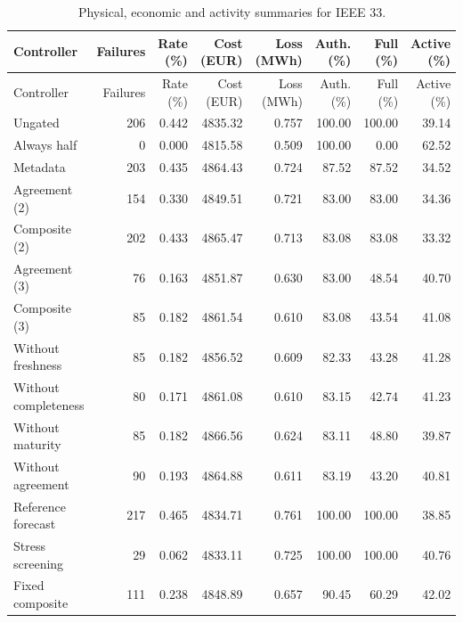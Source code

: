 \documentclass[11pt]{article}
\begin{document}
\small\begin{longtable}{lrrrrrrr}
\caption{Physical, economic and activity summaries for IEEE 33.}\\\toprule
Controller & Failures & Rate (\%) & Cost (EUR) & Loss (MWh) & Auth. (\%) & Full (\%) & Active (\%)\\\midrule
\endfirsthead
\toprule
Controller & Failures & Rate (\%) & Cost (EUR) & Loss (MWh) & Auth. (\%) & Full (\%) & Active (\%)\\\midrule
\endhead
\bottomrule\endfoot
Ungated & 206 & 0.442 & 4835.32 & 0.757 & 100.00 & 100.00 & 39.14\\
Always half & 0 & 0.000 & 4815.58 & 0.509 & 100.00 & 0.00 & 62.52\\
Metadata & 203 & 0.435 & 4864.43 & 0.724 & 87.52 & 87.52 & 34.52\\
Agreement (2) & 154 & 0.330 & 4849.51 & 0.721 & 83.00 & 83.00 & 34.36\\
Composite (2) & 202 & 0.433 & 4865.47 & 0.713 & 83.08 & 83.08 & 33.32\\
Agreement (3) & 76 & 0.163 & 4851.87 & 0.630 & 83.00 & 48.54 & 40.70\\
Composite (3) & 85 & 0.182 & 4861.54 & 0.610 & 83.08 & 43.54 & 41.08\\
Without freshness & 85 & 0.182 & 4856.52 & 0.609 & 82.33 & 43.28 & 41.28\\
Without completeness & 80 & 0.171 & 4861.08 & 0.610 & 83.15 & 42.74 & 41.23\\
Without maturity & 85 & 0.182 & 4866.56 & 0.624 & 83.11 & 48.80 & 39.87\\
Without agreement & 90 & 0.193 & 4864.88 & 0.611 & 83.19 & 43.20 & 40.81\\
Reference forecast & 217 & 0.465 & 4834.71 & 0.761 & 100.00 & 100.00 & 38.85\\
Stress screening & 29 & 0.062 & 4833.11 & 0.725 & 100.00 & 100.00 & 40.76\\
Fixed composite & 111 & 0.238 & 4848.89 & 0.657 & 90.45 & 60.29 & 42.02\\
\end{longtable}\normalsize
\end{document}
